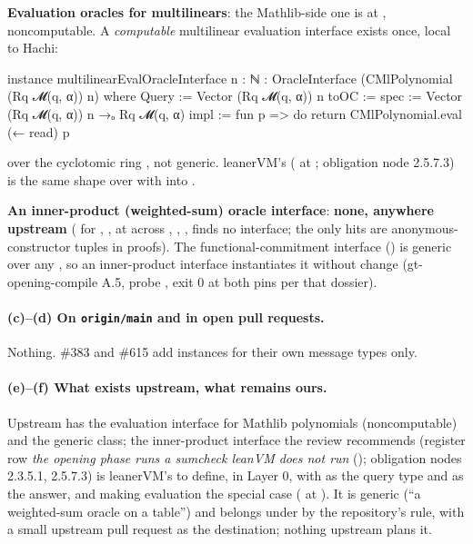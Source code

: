 \textbf{Evaluation oracles for multilinears}: the Mathlib-side one is
 at , noncomputable. A \emph{computable} multilinear
evaluation interface exists once, local to Hachi:
\begin{leancode}
instance multilinearEvalOracleInterface {n : ℕ} :
    OracleInterface (CMlPolynomial (Rq 𝓜(q, α)) n) where
  Query := Vector (Rq 𝓜(q, α)) n
  toOC :=
    { spec := Vector (Rq 𝓜(q, α)) n →ₒ Rq 𝓜(q, α)
      impl := fun p => do return CMlPolynomial.eval (← read) p }
\end{leancode}
over the cyclotomic ring , not generic. leanerVM's 
( at ; obligation node 2.5.7.3) is the same shape over
 with  into .

\textbf{An inner-product (weighted-sum) oracle interface}: \textbf{none, anywhere upstream}
( for , ,  at
 across , , ,
 finds no interface; the only hits are anonymous-constructor tuples in
proofs). The functional-commitment interface 
() is generic over any
, so an inner-product interface instantiates it without change
(gt-opening-compile A.5, probe , exit 0 at both pins per that
dossier).

\paragraph{(c)--(d) On \texttt{origin/main} and in open pull requests.}
Nothing. \#383 and \#615 add  instances for their own message types only.

\paragraph{(e)--(f) What exists upstream, what remains ours.}
Upstream has the evaluation interface for Mathlib polynomials (noncomputable) and the generic
class; the inner-product interface the review recommends (register row \emph{the opening phase
runs a sumcheck leanVM does not run} (); obligation nodes 2.3.5.1, 2.5.7.3) is
leanerVM's to define, in Layer 0, with  as the query type and 
as the answer, and  making evaluation the special case
( at ). It is generic (``a weighted-sum oracle on a
table'') and belongs under  by the repository's rule, with a small upstream pull
request as the destination; nothing upstream plans it.

